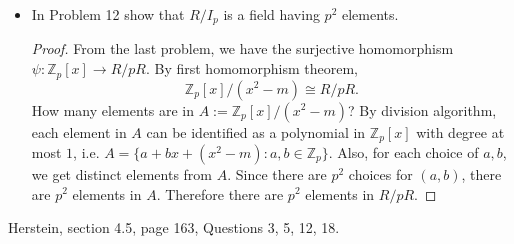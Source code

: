 \begin{itemize}
	\item [13.] In Problem 12 show that $R / I_p$ is a field having $p^2$ elements.
\begin{proof}
	From the last problem, we have the surjective homomorphism $\psi: \mathbb{Z}_p[x] \to R / pR$. By first homomorphism theorem,
	\[
		\mathbb{Z}_p[x] / \left( x^2 - m \right) 
		\cong R / pR
	.\] 
	How many elements are in $A := \mathbb{Z}_p[x] / \left( x^2 - m \right) $? By division algorithm, each element in $A$ can be identified as a polynomial in $\mathbb{Z}_p[x]$ with degree at most $1$, i.e. $A = \{a + bx + \left( x^2 - m \right) : a, b \in \mathbb{Z}_p\} $. Also, for each choice of $a, b$, we get distinct elements from $A$. Since there are $p^2$ choices for $(a,b)$, there are $p^2$ elements in $A$. Therefore there are $p^2$ elements in $R / pR$.
\end{proof}


\end{itemize}
Herstein, section 4.5, page 163, Questions 3, 5, 12, 18.
